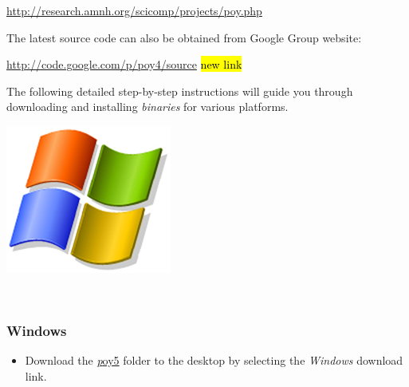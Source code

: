 \begin{center}
\url{http://research.amnh.org/scicomp/projects/poy.php}
\end{center}
The latest source code can also be obtained from \poy Google Group website:
\begin{center}
\url{http://code.google.com/p/poy4/source}
\hl{new link}
\end{center}
The following detailed step-by-step instructions will guide you through downloading and installing \poy \emph{binaries} for various platforms.

\begin{flushleft}
	\begin{minipage}[c]{0.074\textwidth}
	   	\includegraphics[width=\textwidth]{doc/figures/figlogowindows.jpg}
	\end{minipage}
	\,
	\begin{minipage}[t]{0.88\textwidth}
		   	\subsubsection*{Windows}
	\end{minipage}
		\begin{itemize}
			\item
                Download the
                \href{http://research.amnh.org/scicomp/projects/poy.php}{\emph poy5} folder to the desktop by 
                selecting the \emph{Windows} download link.


\end{itemize}
\end{flushleft}
